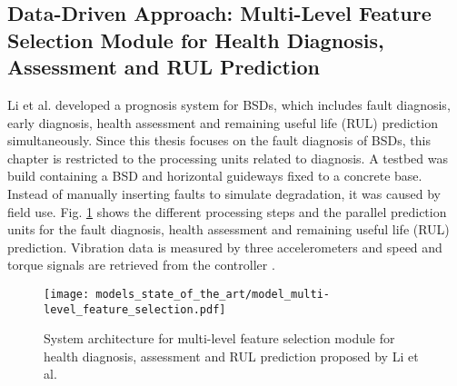 \subsection{Data-Driven Approach: Multi-Level Feature Selection Module for Health Diagnosis, Assessment and RUL Prediction}
Li et al. \cite{LiPin2018} developed a prognosis system for BSDs, which includes fault diagnosis, early diagnosis, health assessment and remaining useful life (RUL) prediction simultaneously. Since this thesis focuses on the fault diagnosis of BSDs, this chapter is restricted to the processing units related to diagnosis. A testbed was build containing a BSD and horizontal guideways fixed to a concrete base. Instead of manually inserting faults to simulate degradation, it was caused by field use. Fig.  \ref{fig:level_feature_selection_model} shows the different processing steps and the parallel prediction units for the fault diagnosis, health assessment and remaining useful life (RUL) prediction. Vibration data is measured by three accelerometers and speed and torque signals are retrieved from the controller \cite{LiPin2018}. 

\begin{figure}[H]
  \centering
  \texttt{[image: models\_state\_of\_the\_art/model\_multi-level\_feature\_selection.pdf]}
  \caption{System architecture for multi-level feature selection module for health diagnosis, assessment and RUL prediction proposed by Li et al. \cite{LiPin2018}}
  \label{fig:level_feature_selection_model}
\end{figure}

